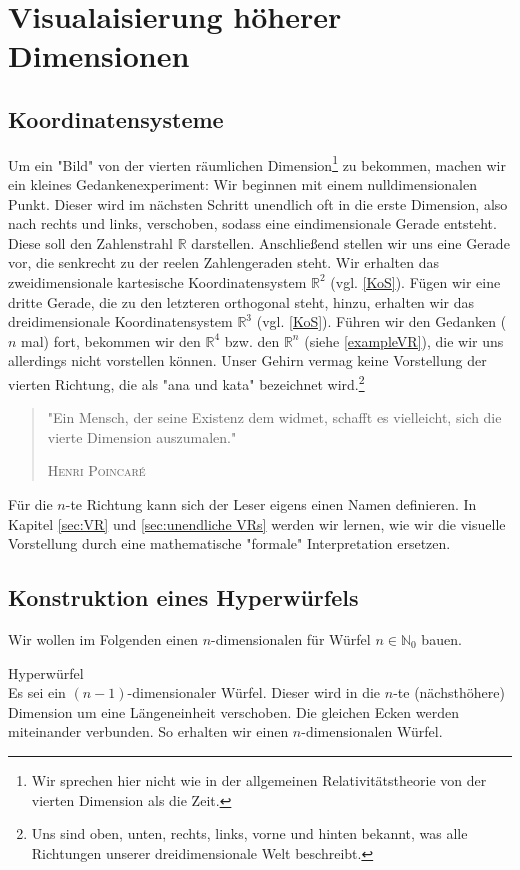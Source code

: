 \chapter{Visualaisierung höherer Dimensionen}
\label{sec:Visualisierung}

\section{Koordinatensysteme}

Um ein "Bild" von der vierten räumlichen Dimension\footnote{Wir sprechen hier nicht wie in der allgemeinen Relativitätstheorie von der vierten Dimension als die Zeit.} zu bekommen, machen wir ein kleines Gedankenexperiment: Wir beginnen mit einem nulldimensionalen Punkt. Dieser wird im nächsten Schritt unendlich oft in die erste Dimension, also nach rechts und links, verschoben, sodass eine eindimensionale Gerade entsteht. Diese soll den Zahlenstrahl $\mathbb{R}$ darstellen. Anschließend stellen wir uns eine Gerade vor, die senkrecht zu der reelen Zahlengeraden steht. Wir erhalten das zweidimensionale kartesische Koordinatensystem $\mathbb{R}^2$ (vgl. \ref{KoS}). Fügen wir eine dritte  Gerade, die zu den letzteren orthogonal steht, hinzu, erhalten wir das dreidimensionale Koordinatensystem $\mathbb{R}^3$ (vgl. \ref{KoS}). Führen wir den Gedanken ($n$ mal) fort, bekommen wir den $\mathbb{R}^4$ bzw. den $\mathbb{R}^n$ (siehe \ref{exampleVR}), die wir uns allerdings nicht vorstellen können. Unser Gehirn vermag keine Vorstellung der vierten Richtung, die als "ana und kata" bezeichnet wird.\footnote{Uns sind oben, unten, rechts, links, vorne und hinten bekannt, was alle Richtungen unserer dreidimensionale Welt beschreibt.}   %
\begin{quote}
"Ein Mensch, der seine Existenz dem widmet, schafft es vielleicht, sich die vierte Dimension auszumalen."
\begin{flushright}
\textsc{Henri Poincaré}
\end{flushright}
\end{quote}
Für die $n$-te Richtung kann sich der Leser eigens einen Namen definieren. In Kapitel \ref{sec:VR} und \ref{sec:unendliche VRs} werden wir lernen, wie wir die visuelle Vorstellung durch eine mathematische "formale" Interpretation ersetzen.

\section{Konstruktion eines Hyperwürfels}
Wir wollen im Folgenden einen $n$-dimensionalen für Würfel $n\in \mathbb{N}_0$ bauen.
\begin{definition} {Hyperwürfel}
\\ Es sei ein $(n-1)$-dimensionaler Würfel. Dieser wird in die $n$-te (nächsthöhere) Dimension um eine Längeneinheit verschoben. Die gleichen Ecken werden miteinander verbunden. So erhalten wir einen $n$-dimensionalen Würfel.
\end{definition}

